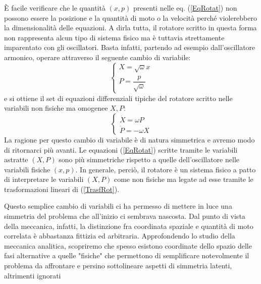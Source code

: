 \documentclass[a4paper,openany]{article}
\begin{document}
	È facile verificare che le quantità $(x,p)$ presenti nelle eq. (\ref{EqRotat}) non possono essere la posizione e la quantità di moto o la velocità perché violerebbero la dimensionalità delle equazioni. A dirla tutta, il rotatore scritto in questa forma non rappresenta alcun tipo di sistema fisico ma è tuttavia strettamente imparentato con gli oscillatori. Basta infatti, partendo ad esempio dall'oscillatore armonico, operare attraverso il seguente cambio di variabile: 
	\begin{equation}
		\begin{cases}
			X = \sqrt{\omega}x \\
			P = \dfrac{p}{\sqrt{\omega}}
		\end{cases}
		\label{TrasfRot}
	\end{equation}
	e si ottiene il set di equazioni differenziali tipiche del rotatore scritto nelle variabili non fisiche ma omogenee $X,P$:
	\begin{equation}
		\begin{cases}
			\dot{X} = \omega P \\
			\dot{P} = -\omega X
		\end{cases}
	\end{equation}
	La ragione per questo cambio di variabile è di natura simmetrica e avremo modo di ritornarci più avanti. Le equazioni (\ref{EqRotat}) scritte tramite le variabili astratte $(X,P)$ sono più simmetriche rispetto a quelle dell'oscillatore nelle variabili fisiche $(x,p)$. In generale, perciò, il rotatore è un sistema fisico a patto di interpretare le variabili $(X,P)$ come non fisiche ma legate ad esse tramite le trasformazioni lineari di (\ref{TrasfRot}).
	
	Questo semplice cambio di variabili ci ha permesso di mettere in luce una simmetria del problema che all'inizio ci sembrava nascosta. Dal punto di vista della meccanica, infatti, la distinzione fra coordinata spaziale e quantità di moto correlata è abbastanza fittizia ed arbitraria. Approfondendo lo studio della meccanica analitica, scopriremo che spesso esistono coordinate dello spazio delle fasi alternative a quelle "fisiche" che permettono di semplificare notevolmente il problema da affrontare e persino sottolineare aspetti di simmetria latenti, altrimenti ignorati
	\newpage
\end{document}
